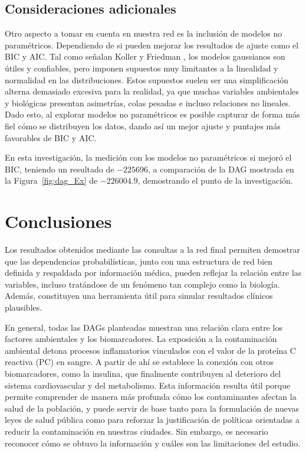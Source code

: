 \documentclass[eng]{ajceam-class}
\begin{document}
\subsection{Consideraciones adicionales}

Otro aspecto a tomar en cuenta en nuestra red es la inclusión de modelos no paramétricos. Dependiendo de si pueden mejorar los resultados de ajuste como el BIC y AIC. Tal como señalan Koller y Friedman \cite{koller2009pgm}, los modelos gaussianos son útiles y confiables, pero imponen supuestos muy limitantes a la linealidad y normalidad en las distribuciones. Estos supuestos suelen ser una simplificación alterna demasiado excesiva para la realidad, ya que muchas variables ambientales y biológicas presentan asimetrías, colas pesadas e incluso relaciones no lineales. Dado esto, al explorar modelos no paramétricos es posible capturar de forma más fiel cómo se distribuyen los datos, dando así un mejor ajuste y puntajes más favorables de BIC y AIC.

En esta investigación, la medición con los modelos no paramétricos si mejoró el BIC, teniendo un resultado de $-225696$, a comparación de la DAG mostrada en la Figura~\ref{fig:dag_Ex} de $-226004.9$, demostrando el punto de la investigación.

\section{Conclusiones}
Los resultados obtenidos mediante las consultas a la red final permiten demostrar que las dependencias probabilísticas, junto con una estructura de red bien definida y respaldada por información médica, pueden reflejar la relación entre las variables, incluso tratándose de un fenómeno tan complejo como la biología. Además, constituyen una herramienta útil para simular resultados clínicos plausibles.

En general, todas las DAGs planteadas muestran una relación clara entre los factores ambientales y los biomarcadores. La exposición a la contaminación ambiental detona procesos inflamatorios vinculados con el valor de la proteína C reactiva (PC) en sangre. A partir de ahí se establece la conexión con otros biomarcadores, como la insulina, que finalmente contribuyen al deterioro del sistema cardiovascular y del metabolismo. Esta información resulta útil porque permite comprender de manera más profunda cómo los contaminantes afectan la salud de la población, y puede servir de base tanto para la formulación de nuevas leyes de salud pública como para reforzar la justificación de políticas orientadas a reducir la contaminación en nuestras ciudades. Sin embargo, es necesario reconocer cómo se obtuvo la información y cuáles son las limitaciones del estudio.
\end{document}
